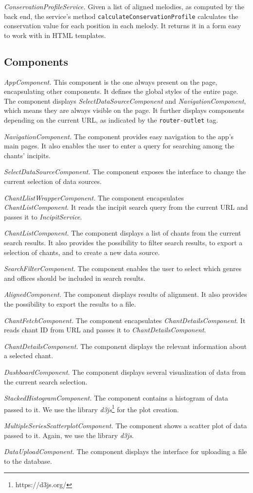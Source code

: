 \emph{ConservationProfileService.} Given a list of aligned melodies, as computed by the back end, the service's method \verb|calculateConservationProfile|
calculates the conservation value for each position in each melody. It returns it in a form easy to work with in HTML templates.

\subsection{Components}

\emph{AppComponent.} This component is the one always present on the page, encapsulating other components. It defines the global styles of the entire page.
The component displays \emph{SelectDataSourceComponent} and \emph{NavigationComponent}, which means they are always visible on the page. It further displays
components depending on the current URL, as indicated by the \verb|router-outlet| tag.

\emph{NavigationComponent.} The component provides easy navigation to the app's main pages. It also enables the user to enter a query for searching
among the chants' incipits.

\emph{SelectDataSourceComponent.} The component exposes the interface to change the current selection of data sources.

\emph{ChantLlistWrapperComponent.} The component encapsulates \emph{ChantListComponent}. It reads the incipit search query from the current URL and
passes it to \emph{IncipitService}.

\emph{ChantListComponent.} The component displays a list of chants from the current search results. It also provides the possibility to filter search
results, to export a selection of chants, and to create a new data source.

\emph{SearchFilterComponent.} The component enables the user to select which genres and offices should be included in search results.

\emph{AlignedComponent.} The component displays results of alignment. It also provides the possibility to export the results to a file.

\emph{ChantFetchComponent.} The component encapsulates \emph{ChantDetailsComponent}. It reads chant ID from URL and passes it to \emph{ChantDetailsComponent}.

\emph{ChantDetailsComponent.} The component displays the relevant information about a selected chant.

\emph{DashboardComponent.} The component displays several visualization of data from the current search selection.

\emph{StackedHistogramComponent.} The component contains a histogram of data passed to it. We use the library \emph{d3js}\footnote{https://d3js.org/}
for the plot creation.

\emph{MultipleSeriesScatterplotComponent.} The component shows a scatter plot of data passed to it. Again, we use the library \emph{d3js}.

\emph{DataUploadComponent.} The component displays the interface for uploading a file to the database.

